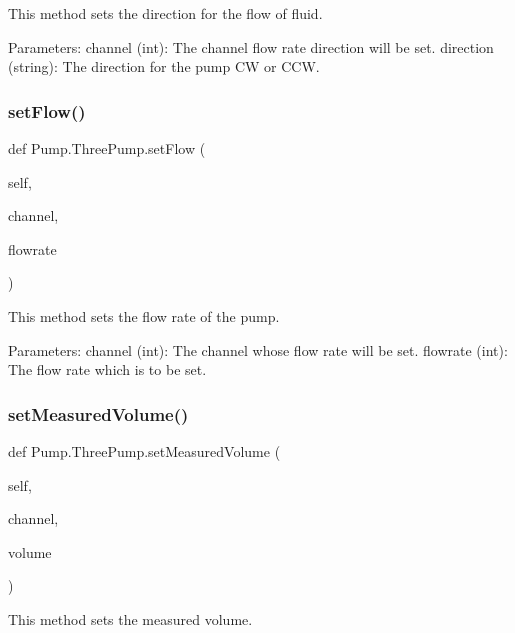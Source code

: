 \begin{DoxyVerb}This method sets the direction for the flow of fluid.

Parameters:
    channel (int): The channel flow rate direction will be set.
    direction (string): The direction for the pump CW or CCW.
\end{DoxyVerb}
 \mbox{\label{class_pump_1_1_three_pump_af318067f4573840cdcf5ed34be7c06ee}} 
\subsubsection{\texorpdfstring{setFlow()}{setFlow()}}
{\footnotesize\ttfamily def Pump.\+Three\+Pump.\+set\+Flow (\begin{DoxyParamCaption}\item[{}]{self,  }\item[{}]{channel,  }\item[{}]{flowrate }\end{DoxyParamCaption})}

\begin{DoxyVerb}This method sets the flow rate of the pump.

Parameters:
    channel (int): The channel whose flow rate will be set.
    flowrate (int): The flow rate which is to be set.
\end{DoxyVerb}
 \mbox{\label{class_pump_1_1_three_pump_ab8d0c7431108de453afbc7d61210a521}} 
\subsubsection{\texorpdfstring{setMeasuredVolume()}{setMeasuredVolume()}}
{\footnotesize\ttfamily def Pump.\+Three\+Pump.\+set\+Measured\+Volume (\begin{DoxyParamCaption}\item[{}]{self,  }\item[{}]{channel,  }\item[{}]{volume }\end{DoxyParamCaption})}

\begin{DoxyVerb}This method sets the measured volume.
\end{DoxyVerb}
 \mbox{\label{class_pump_1_1_three_pump_a4dd2281d58ae1b975676270045a6fe04}} 

